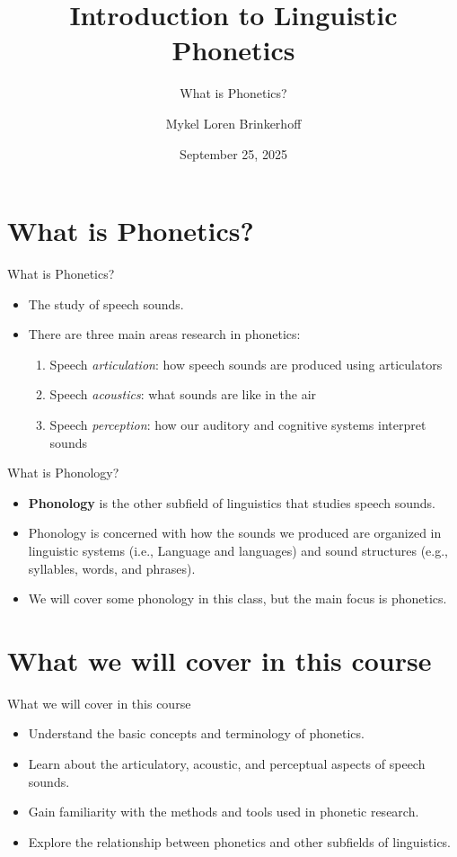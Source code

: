 \documentclass{beamer}
\title[LING 450/550] %
{Introduction to Linguistic Phonetics}
\subtitle{What is Phonetics?}
\author[Brinkerhoff] %
{Mykel Loren Brinkerhoff}
\institute[UW] %
{University of Washington}
\date[2025-09-25] %
{September 25, 2025}
\begin{document}
\begin{frame}
  \titlepage
\end{frame}

\section{What is Phonetics?}
\begin{frame}{What is Phonetics?}
    \begin{itemize}
        \item The study of speech sounds.
        \item There are three main areas research in phonetics:
        \begin{enumerate}
            \item Speech \textit{articulation}: how speech sounds are produced using articulators
            \item Speech \textit{acoustics}: what sounds are like in the air
            \item Speech \textit{perception}: how our auditory and cognitive systems interpret sounds
        \end{enumerate}
    \end{itemize}
\end{frame}

\begin{frame}{What is Phonology?}
    \begin{itemize}
        \item \textbf{Phonology} is the other subfield of linguistics that studies speech sounds.
        \item Phonology is concerned with how the sounds we produced are organized in linguistic systems (i.e., Language and languages) and sound structures (e.g., syllables, words, and phrases).
        \item We will cover some phonology in this class, but the main focus is phonetics.
    \end{itemize}
\end{frame}

\section{What we will cover in this course}
\begin{frame}{What we will cover in this course}
    \begin{itemize}
        \item Understand the basic concepts and terminology of phonetics.
        \item Learn about the articulatory, acoustic, and perceptual aspects of speech sounds.
        \item Gain familiarity with the methods and tools used in phonetic research.
        \item Explore the relationship between phonetics and other subfields of linguistics.
    \end{itemize}
\end{frame}
\end{document}
